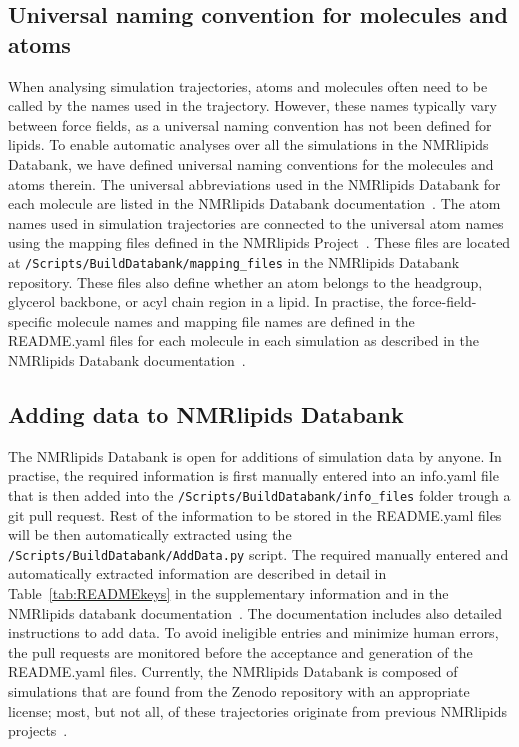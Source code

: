 \documentclass[fleqn,10pt]{wlscirep}
\begin{document}
\subsection{Universal naming convention for molecules and atoms} \label{naming}
When analysing simulation trajectories, atoms and molecules often need to be  called by the names used in the trajectory. However, these names typically vary between force fields, as a universal naming convention has not been defined for lipids. To enable automatic analyses over all the simulations in the NMRlipids Databank, we have defined universal naming conventions for the molecules and atoms therein. The universal abbreviations used in the NMRlipids Databank for each molecule are listed in the NMRlipids Databank documentation~\cite{NMRlipidsDocsMolAndMapping}.
The atom names used in simulation trajectories are connected to the universal atom names using the mapping files defined in the NMRlipids Project~\cite{NMRlipidsDocsMolAndMapping}. These files are located at \texttt{/Scripts/BuildDatabank/mapping\_files} in the NMRlipids Databank repository. These files also define whether an atom belongs to the headgroup, glycerol backbone, or acyl chain region in a lipid. In practise, the force-field-specific molecule names and mapping file
names are defined in the README.yaml files for each molecule in each simulation as described in the NMRlipids Databank documentation~\cite{NMRlipidsREADMEfiles}.

\subsection{Adding data to NMRlipids Databank}
The NMRlipids Databank is open for additions of simulation data by anyone. In practise, the required information is first manually entered into an info.yaml file that is then added into the \texttt{/Scripts/BuildDatabank/info\_files} folder trough a git pull request. Rest of the information to be stored in the README.yaml files will be then automatically extracted using the \texttt{/Scripts/BuildDatabank/AddData.py} script. The required manually entered and automatically extracted information are described in detail in Table~\ref{tab:READMEkeys} in the supplementary information and in the NMRlipids databank documentation~\cite{NMRlipidsREADMEfiles}. The documentation includes also detailed instructions to add data. To avoid ineligible entries and minimize human errors, the pull requests are monitored before the acceptance and generation of the README.yaml files.  Currently, the NMRlipids Databank is composed of simulations that are found from the Zenodo repository with an appropriate license; most, but not all, of these trajectories originate from previous NMRlipids projects~\cite{botan15,catte16,antila19,bacle21}.
\end{document}
